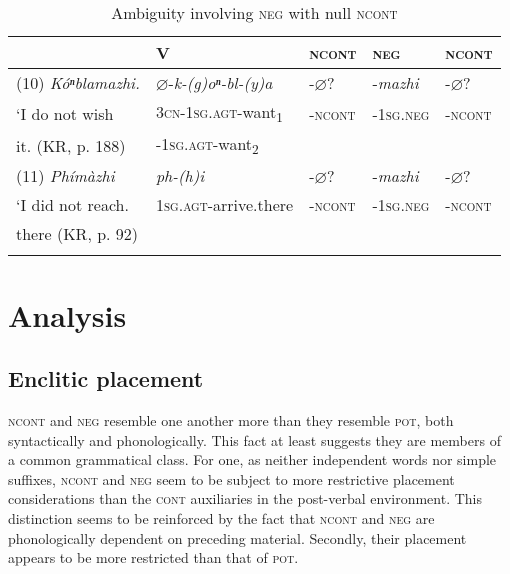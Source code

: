 \documentclass[output=paper]{LSP/langsci}
\begin{document}
\begin{table}
\caption{Ambiguity involving \textsc{neg} with null \textsc{ncont}} \label{ambiguity}
\begin{tabular}[h!]{ l l l l l }
\lsptoprule
& V & \textsc{ncont}	& \textsc{neg} & \textsc{ncont} \\
\midrule
(10)	\textit{K\'oⁿblamazhi.} & $\varnothing$-\textit{k-(g)oⁿ-bl-(y)a}  & -$\varnothing$? & -\textit{mazhi} & -$\varnothing$? \\
\hspace{2em}`I do not wish & \textsc{3cn-1sg.agt-}want\textsubscript{1} &	-\textsc{ncont} & -\textsc{1sg.neg} & \textsc{-ncont} \\
\hspace{2em} it. (KR, p. 188) & -\textsc{1sg.agt}-want\textsubscript{2} & & & \\

(11)	\textit{Ph\'im\`azhi}	& \textit{ph-(h)i} & -$\varnothing$? & 	-\textit{mazhi}	& -$\varnothing$? \\
\hspace{2em}`I did not reach. & \textsc{1sg.agt}-arrive.there & \textsc{-ncont} & \textsc{-1sg.neg} & \textsc{-ncont} \\
\hspace{2em} there (KR, p. 92) & & & & \\
\lspbottomrule
\end{tabular}
\end{table}

\section{Analysis}
\subsection{Enclitic placement}
\textsc{ncont} and \textsc{neg} resemble one another more than they resemble \textsc{pot}, both syntactically and phonologically. This fact at least suggests they are members of a common grammatical class. For one, as neither independent words nor simple suffixes, \textsc{ncont} and \textsc{neg} seem to be subject to more restrictive placement considerations than the \textsc{cont} auxiliaries in the post-verbal environment. This distinction seems to be reinforced by the fact that \textsc{ncont} and \textsc{neg} are phonologically dependent on preceding material. Secondly, their placement appears to be more restricted than that of \textsc{pot}.
\end{document}
